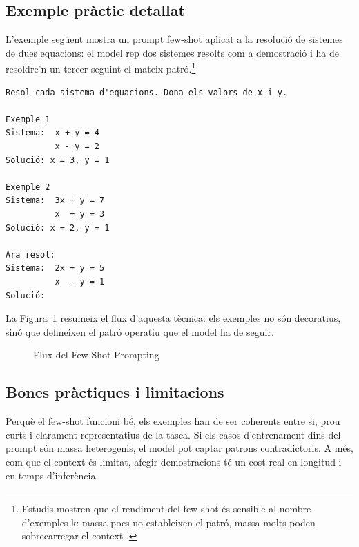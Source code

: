 \documentclass[12pt,a4paper]{report}
\newcommand{\source}[1]{\par\vspace{0.15em}{\small\textit{Font: #1.}}}
\begin{document}
\subsection{Exemple pràctic detallat}
L'exemple següent mostra un prompt few-shot aplicat a la resolució de sistemes de dues equacions: el model rep dos sistemes resolts com a demostració i ha de resoldre'n un tercer seguint el mateix patró.\footnote{Estudis mostren que el rendiment del few-shot és sensible al nombre d'exemples k: massa pocs no estableixen el patró, massa molts poden sobrecarregar el context \cite{liu2023}.}
\begin{verbatim}
Resol cada sistema d'equacions. Dona els valors de x i y.

Exemple 1
Sistema:  x + y = 4
          x - y = 2
Solució: x = 3, y = 1

Exemple 2
Sistema:  3x + y = 7
          x  + y = 3
Solució: x = 2, y = 1

Ara resol:
Sistema:  2x + y = 5
          x  - y = 1
Solució:
\end{verbatim}
La Figura~\ref{fig:fewshot} resumeix el flux d'aquesta tècnica: els exemples no són decoratius, sinó que defineixen el patró operatiu que el model ha de seguir.

\begin{figure}[H]
  \centering
  \caption{Flux del Few-Shot Prompting}
  \label{fig:fewshot}
  \source{Compilada per l'Autor}
\end{figure}

\subsection{Bones pràctiques i limitacions}
Perquè el few-shot funcioni bé, els exemples han de ser coherents entre si, prou curts i clarament representatius de la tasca. Si els casos d'entrenament dins del prompt són massa heterogenis, el model pot captar patrons contradictoris. A més, com que el context és limitat, afegir demostracions té un cost real en longitud i en temps d'inferència.
\end{document}
